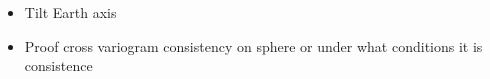 \begin{itemize}
\item Tilt Earth axis
\item Proof cross variogram consistency on sphere or under what conditions it is consistence  
\end{itemize}